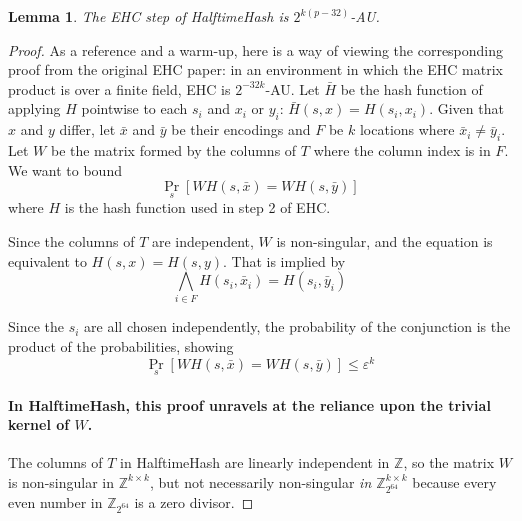 \documentclass[sigconf, nonacm]{acmart}
\newtheorem*{lemma}{Lemma}
\newcommand{\ints}{\mathbb{Z}}
\begin{document}
\begin{lemma}
  The EHC step of HalftimeHash is $2^{k(p-32)}$-AU.
\end{lemma}

\begin{proof}
As a reference and a warm-up, here is a way of viewing the corresponding proof from the original EHC paper:
in an environment in which the EHC matrix product is over a finite field, EHC is $2^{-32k}$-AU.
Let $\bar{H}$ be the hash function of applying $H$ pointwise to each $s_i$ and $x_i$ or $y_i$: $\bar{H}(s, x) = H(s_i, x_i)$.
Given that $x$ and $y$ differ, let $\bar{x}$ and $\bar{y}$ be their encodings and $F$ be $k$ locations where $\bar{x}_i \neq \bar{y}_i$.
Let $W$ be the matrix formed by the columns of $T$ where the column index is in $F$.
We want to bound
\begin{equation}
  \label{ehc-delta}
  \Pr_s[W  H(s,\bar{x}) = W H(s,\bar{y})]
\end{equation}
where $H$ is the hash function used in step 2 of EHC.

Since the columns of $T$ are independent, $W$ is non-singular, and the equation is equivalent to $H(s,x) = H(s,y)$.
That is implied by
\[
\bigwedge_{i \in F} H(s_i, \bar{x}_i) = H(s_i, \bar{y}_i)
\]

Since the $s_i$ are all chosen independently, the probability of the conjunction is the product of the probabilities, showing
\[
\Pr_s[W H(s,\bar{x}) = W H(s,\bar{y})] \leq \varepsilon^k
\]

\paragraph{In HalftimeHash, this proof unravels at the reliance upon the trivial kernel of $W$.}

The columns of $T$ in HalftimeHash are linearly independent in $\ints$, so the matrix $W$ is non-singular in $\ints^{k\times{}k}$, but not necessarily non-singular {\em in $\ints_{2^{64}}^{k\times{}k}$} because every even number in $\ints_{2^{64}}$ is a zero divisor.


\end{proof}
\end{document}

